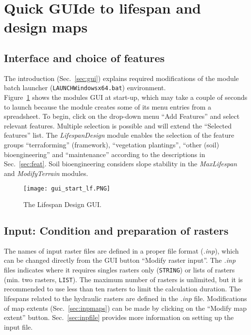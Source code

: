 \section{Quick GUIde to lifespan and design maps} \label{sec:lfgui}
\subsection{Interface and choice of features}
The introduction (Sec.~\ref{sec:gui}) explains required modifications of the module batch launcher (\texttt{LAUNCH{\myUnderscore}Windows{\myUnderscore}x64.bat}) environment.\\
Figure~\ref{fig:gui_start_lf} shows the modules GUI at start-up, which may take a couple of seconds to launch because the module creates some of its menu entries from a spreadsheet. To begin, click on the drop-down menu ``Add Features'' and select relevant features. Multiple selection is possible and will extend the ``Selected features'' list. The \textit{LifespanDesign} module enables the selection of the feature groups ``terraforming'' (framework), ``vegetation plantings'', ``other (soil) bioengineering'' and ``maintenance'' according to the descriptions in Sec.~\ref{sec:feat}. Soil bioengineering considers slope stability in the \textit{MaxLifespan} and \textit{ModifyTerrain} modules.
\begin{figure}[hbt]
	\begin{center}
	\texttt{[image: gui\_start\_lf.PNG]} %
	\caption{The Lifespan Design GUI. \label{fig:gui_start_lf}}
	\end{center}
\end{figure}



\subsection{Input: Condition and preparation of rasters}\label{sec:inpras}
The names of input raster files are defined in a proper file format (\textit{.inp}), which can be changed directly from the GUI button ``Modify raster input''. The \textit{.inp} files indicates where it requires singles rasters only (\texttt{STRING}) or lists of rasters (min. two rasters, \texttt{LIST}). The maximum number of rasters is unlimited, but it is recommended to use less than ten rasters to limit the calculation duration. The lifespans related to the hydraulic rasters are defined in the \textit{.inp} file. Modifications of map extents (Sec.~\ref{sec:inpmaps}) can be made by clicking on the ``Modify map extent'' button. Sec.~\ref{sec:inpfile} provides more information on setting up the input file.


